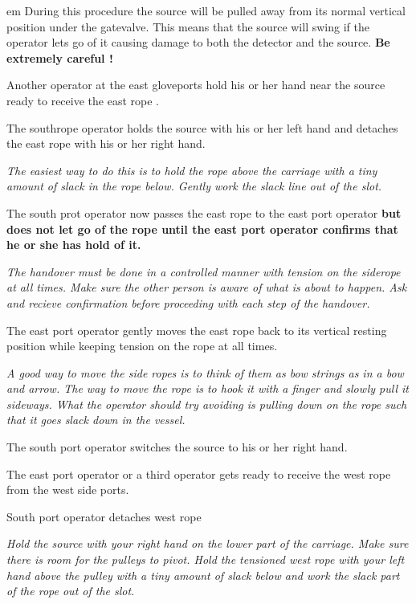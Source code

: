 \begin{enumerate}
\small
{em 
    During this procedure the source will be pulled away from its normal
    vertical position under the gatevalve. This means that the source will swing
if the operator lets go of it causing damage to both the detector and the source.
 {\bf Be extremely careful !}
}
\normalsize

\checkitem Another operator at the east gloveports hold his or her hand 
near the source  ready to receive  the east rope .



\checkitem The southrope operator holds the source with his or her left hand and
detaches the east rope with his or her right hand.

\small
{\em The easiest way to do this is to hold the rope above the carriage
with a tiny amount of slack in the rope below. Gently work the slack line out of
the slot.
}
\normalsize



\checkitem The south prot operator now passes the east rope  to the east port operator
{\bf but does not let go of the rope until the east
 port operator confirms that he or she has hold of it.}

\small
{\em The handover must be done in a controlled manner with tension on the siderope at
all times. Make sure the other person
is aware of what is about to happen. Ask and recieve confirmation before proceeding
with each step of the handover. }
\normalsize


\checkitem The east port operator gently moves the east rope back to its vertical
resting position while keeping tension on the rope at all times.

  \small
  {\em
    A good way to move the side ropes is to think of them as
    bow strings as in a bow and arrow.  The way to move the rope
    is to hook it with a finger and slowly pull it sideways.  What
    the operator should try avoiding is pulling down on the rope
    such that it goes slack down in the vessel.
  }
  \normalsize



\checkitem The south port operator switches the source to his or her right hand.

\checkitem The east port operator or a third operator gets ready to receive
the west rope from the west side ports.



\checkitem South port operator detaches west rope 

\small
{\em Hold the source with your right hand on  the lower part of the
carriage. Make sure there is room for the pulleys to pivot. Hold the tensioned west
rope with your left hand above the pulley with a tiny amount of slack below and work
the slack part of the rope out of the slot.
}
\normalsize


\end{enumerate}
